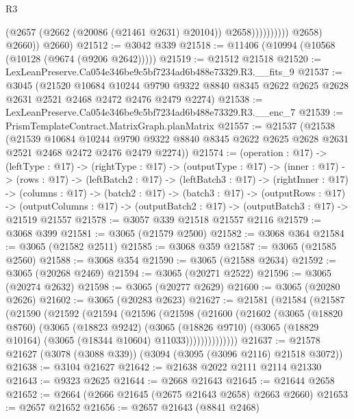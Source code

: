 \begin{lexlean}{R3}
\begin{coremodule}
                              (@2657 (@2662 (@20086 (@21461 @2631) @20104)) @2658))))))))))
            @2658)
          @2660))
      @2660)
@21512 := @3042 @339
@21518 := @11406 (@10994 (@10568 (@10128 (@9674 (@9206 @2642)))))
@21519 := @21512 @21518
@21520 := LexLeanPreserve.Ca054e346be9c5bf7234ad6b488e73329.R3.__fits_9
@21537 := @3045
    (@21520
      @10684
      @10244
      @9790
      @9322
      @8840
      @8345
      @2622
      @2625
      @2628
      @2631
      @2521
      @2468
      @2472
      @2476
      @2479
      @2274)
@21538 := LexLeanPreserve.Ca054e346be9c5bf7234ad6b488e73329.R3.__enc_7
@21539 := PrismTemplateContract.MatrixGraph.planMatrix
@21557 := @21537
    (@21538
      (@21539
        @10684
        @10244
        @9790
        @9322
        @8840
        @8345
        @2622
        @2625
        @2628
        @2631
        @2521
        @2468
        @2472
        @2476
        @2479
        @2274))
@21574 := (operation : @17) ->
  (leftType : @17) ->
  (rightType : @17) ->
  (outputType : @17) ->
  (inner : @17) ->
  (rows : @17) ->
  (leftBatch2 : @17) ->
  (leftBatch3 : @17) ->
  (rightInner : @17) ->
  (columns : @17) ->
  (batch2 : @17) ->
  (batch3 : @17) ->
  (outputRows : @17) ->
  (outputColumns : @17) -> (outputBatch2 : @17) -> (outputBatch3 : @17) -> @21519 @21557
@21578 := @3057 @339 @21518 @21557 @2116
@21579 := @3068 @399
@21581 := @3065 (@21579 @2500)
@21582 := @3068 @364
@21584 := @3065 (@21582 @2511)
@21585 := @3068 @359
@21587 := @3065 (@21585 @2560)
@21588 := @3068 @354
@21590 := @3065 (@21588 @2634)
@21592 := @3065 (@20268 @2469)
@21594 := @3065 (@20271 @2522)
@21596 := @3065 (@20274 @2632)
@21598 := @3065 (@20277 @2629)
@21600 := @3065 (@20280 @2626)
@21602 := @3065 (@20283 @2623)
@21627 := @21581
    (@21584
      (@21587
        (@21590
          (@21592
            (@21594
              (@21596
                (@21598
                  (@21600
                    (@21602
                      (@3065
                        (@18820 @8760)
                        (@3065
                          (@18823 @9242)
                          (@3065
                            (@18826 @9710)
                            (@3065 (@18829 @10164) (@3065 (@18344 @10604) @11033))))))))))))))
@21637 := @21578 @21627 (@3078 (@3088 @339)) (@3094 (@3095 (@3096 @2116) @21518 @3072))
@21638 := @3104 @21627
@21642 := @21638 @2022 @2111 @2114 @21330
@21643 := @9323 @2625
@21644 := @2668 @21643
@21645 := @21644 @2658
@21652 := @2664 (@2666 @21645 (@2675 @21643 @2658) @2663 @2660)
@21653 := @2657 @21652
@21656 := @2657 @21643 (@8841 @2468)

\end{coremodule}
\end{lexlean}
